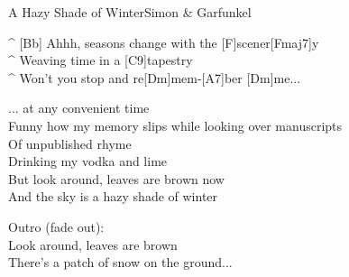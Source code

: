 \begin{song}{A Hazy Shade of Winter}{Simon \& Garfunkel}
\begin{guitar}
^ [Bb]  Ahhh, seasons change with the [F]scener[Fmaj7]y\\
^ Weaving time in a [C9]tapestry\\
^ Won't you stop and re[Dm]mem-[A7]ber [Dm]me...\\
\end{guitar}

\begin{guitar}
... at any convenient time\\
Funny how my memory slips while looking over manuscripts\\
Of unpublished rhyme\\
Drinking my vodka and lime\\
But look around, leaves are brown now\\
And the sky is a hazy shade of winter\\
\end{guitar}

\begin{guitar}
Outro (fade out):\\
Look around, leaves are brown\\
There's a patch of snow on the ground...\\
\end{guitar}
\end{song}
